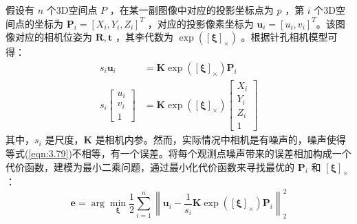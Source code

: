  假设有 $n$ 个3D空间点 $P$ ，在某一副图像中对应的投影坐标点为 $p$ ，第 $i$ 个3D空间点的坐标为 $\bm{P}_{i}=\left[X_{i}, Y_{i}, Z_{i}\right]^{T} $ ，对应的投影像素坐标为 $\boldsymbol{u}_{i}=\left[u_{i}, v_{i}\right]^{T} $。该图像对应的相机位姿为 $\bm{R}, \bm{t} $ ，其李代数为 $ \exp \left( \left[ \boldsymbol{\xi} \right]_\times \right) $ 。根据针孔相机模型可得：
\begin{equation}
\label{eqn:3.79}
\begin{aligned}
s_{i} \boldsymbol{u}_{i} &= \boldsymbol{K} \exp \left(  \left[\boldsymbol{\xi}\right]_\times  \right) \boldsymbol{P}_{i} \\
s_{i} \left[ \begin{array}{c}{u_{i}} \\ {v_{i}} \\ {1}\end{array}\right] &= \boldsymbol{K} \exp \left(  \left[\boldsymbol{\xi}\right]_\times \right) \left[ \begin{array}{c}{X_{i}} \\ {Y_{i}} \\ {Z_{i}} \\ {1}\end{array}\right]
\end{aligned}
\end{equation}
其中，$s_i $ 是尺度，$\bm{K} $ 是相机内参。然而，实际情况中相机是有噪声的，噪声使得等式(\ref{eqn:3.79})不相等，有一个误差。将每个观测点噪声带来的误差相加构成一个代价函数，建模为最小二乘问题，通过最小化代价函数来寻找最优的 $\bm{P}_i$ 和 $ \left[\boldsymbol{\xi}\right]_\times  $ ：
\begin{equation}
\label{eqn:3.80}
\boldsymbol{e} =\arg \min _{\boldsymbol{\xi}} \frac{1}{2} \sum_{i=1}^{n}\left\|\boldsymbol{u}_{i}-\frac{1}{s_{i}} \boldsymbol{K} \exp \left(  \left[\boldsymbol{\xi}\right]_\times  \right) \boldsymbol{P}_{i}\right\|_{2}^{2}
\end{equation}

